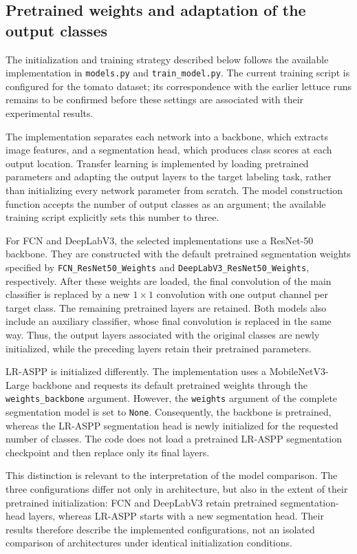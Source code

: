 \subsection{Pretrained weights and adaptation of the output classes}
\label{subsec:c3_pretrained_weights}

The initialization and training strategy described below follows the
available implementation in \texttt{models.py} and
\texttt{train\_model.py}. The current training script is configured for
the tomato dataset; its correspondence with the earlier lettuce runs
remains to be confirmed before these settings are associated with their
experimental results.

The implementation separates each network into a backbone, which extracts
image features, and a segmentation head, which produces class scores at
each output location. Transfer learning is implemented by loading
pretrained parameters and adapting the output layers to the target
labeling task, rather than initializing every network parameter from
scratch. The model construction function accepts the number of output
classes as an argument; the available training script explicitly sets
this number to three.

For FCN and DeepLabV3, the selected implementations use a ResNet-50
backbone. They are constructed with the default pretrained segmentation
weights specified by \texttt{FCN\_ResNet50\_Weights} and
\texttt{DeepLabV3\_ResNet50\_Weights}, respectively. After these weights
are loaded, the final convolution of the main classifier is replaced by
a new $1\times1$ convolution with one output channel per target class.
The remaining pretrained layers are retained. Both models also include
an auxiliary classifier, whose final convolution is replaced in the same
way. Thus, the output layers associated with the original classes are
newly initialized, while the preceding layers retain their pretrained
parameters.

LR-ASPP is initialized differently. The implementation uses a
MobileNetV3-Large backbone and requests its default pretrained weights
through the \texttt{weights\_\allowbreak backbone} argument. However, the
\texttt{weights} argument of the complete segmentation model is set to
\texttt{None}. Consequently, the backbone is pretrained, whereas the
LR-ASPP segmentation head is newly initialized for the requested number
of classes. The code does not load a pretrained LR-ASPP segmentation
checkpoint and then replace only its final layers.

This distinction is relevant to the interpretation of the model
comparison. The three configurations differ not only in architecture,
but also in the extent of their pretrained initialization: FCN and
DeepLabV3 retain pretrained segmentation-head layers, whereas LR-ASPP
starts with a new segmentation head. Their results therefore describe
the implemented configurations, not an isolated comparison of
architectures under identical initialization conditions.

